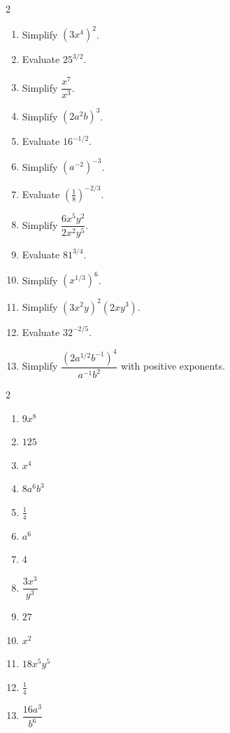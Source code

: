 \documentclass[11pt]{article}
\begin{document}
\begin{recapbox}
\begin{multicols}{2}
\small
\begin{enumerate}[leftmargin=*,itemsep=3pt]
  \item Simplify $(3x^4)^2$.
  \item Evaluate $25^{3/2}$.
  \item Simplify $\dfrac{x^7}{x^3}$.
  \item Simplify $(2a^2b)^3$.
  \item Evaluate $16^{-1/2}$.
  \item Simplify $(a^{-2})^{-3}$.
  \item Evaluate $\left(\tfrac18\right)^{-2/3}$.
  \item Simplify $\dfrac{6x^5y^2}{2x^2y^5}$.
  \item Evaluate $81^{3/4}$.
  \item Simplify $(x^{1/3})^6$.
  \item Simplify $(3x^2y)^2(2xy^3)$.
  \item Evaluate $32^{-2/5}$.
  \item Simplify $\dfrac{(2a^{1/2}b^{-1})^4}{a^{-1}b^{2}}$ with positive exponents.
\end{enumerate}
\end{multicols}
\end{recapbox}

\begin{keybox}
\begin{multicols}{2}
\small
\begin{enumerate}[leftmargin=*,itemsep=3pt]
  \item $9x^8$
  \item $125$
  \item $x^4$
  \item $8a^6b^3$
  \item $\tfrac14$
  \item $a^6$
  \item $4$
  \item $\dfrac{3x^3}{y^3}$
  \item $27$
  \item $x^2$
  \item $18x^5y^5$
  \item $\tfrac14$
  \item $\dfrac{16a^3}{b^6}$
\end{enumerate}
\end{multicols}
\end{keybox}
\end{document}
